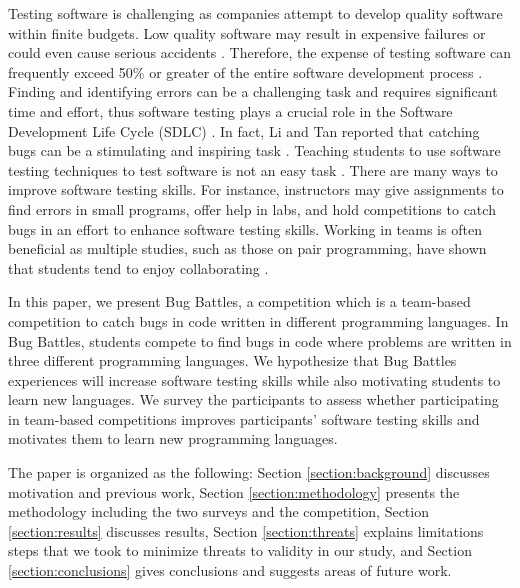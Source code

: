 \documentclass{article}
\begin{document}
Testing software is challenging as companies attempt to develop quality software within finite budgets. Low quality software may result in expensive failures or could even cause serious accidents \cite{9627426}. Therefore, the expense of testing software can frequently exceed 50\% or greater of the entire software development process \cite{9452870}. Finding and identifying errors can be a challenging task and requires significant time and effort, thus software testing plays a crucial role in the Software Development Life Cycle (SDLC) \cite{10.5555/3575846.3575854}. In fact, Li and Tan reported that 
catching bugs can be a stimulating and inspiring task \cite{9270394}. Teaching students to use software testing techniques to test software is not an easy task \cite{Lauvs2018RecentTI}. There are many ways to improve software testing skills. For instance, instructors may give assignments to find errors in small programs, offer help in labs, and hold competitions to catch bugs in an effort to enhance software testing skills. Working in teams is often beneficial as multiple studies, such as those on pair programming, have shown that students tend to enjoy collaborating \cite{10.5555/2038836.2038842}.

In this paper, we present Bug Battles, a competition which is a team-based competition to catch bugs in code written in different programming languages. In Bug Battles, students compete to find bugs in code where problems are written in three different programming languages. We hypothesize that Bug Battles experiences will increase software testing skills while also motivating students to learn new languages. We survey the participants to assess whether participating in team-based competitions improves participants' software testing skills and motivates them to learn new programming languages.

The paper is organized as the following: Section \ref{section:background} discusses motivation and previous work, Section \ref{section:methodology} presents the methodology including the two surveys and the competition, Section \ref{section:results} discusses results, Section \ref{section:threats} explains limitations steps that we took to minimize threats to validity in our study, and Section \ref{section:conclusions} gives conclusions and suggests areas of future work.
\end{document}
